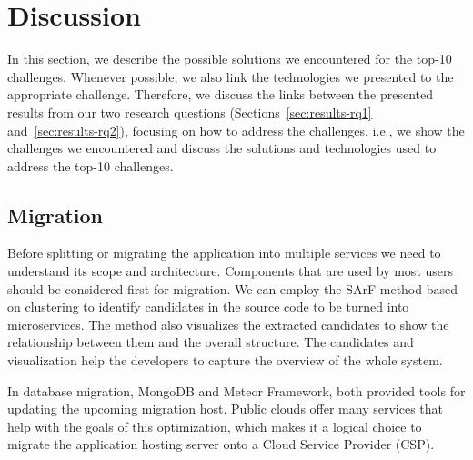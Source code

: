 
\section{Discussion}\label{sec:discussion}

In this section, we describe the possible solutions we encountered for the top-10 challenges. Whenever possible, we also link the technologies we presented to the appropriate challenge. Therefore, we discuss the links between the presented results from our two research questions (Sections~\ref{sec:results-rq1} and~\ref{sec:results-rq2}), focusing on how to address the challenges, i.e., we show the challenges we encountered and discuss the solutions and technologies used to address the top-10 challenges.

\subsection{Migration}%

Before splitting or migrating the application into multiple services we need to understand its scope and architecture. Components that are used by most users should be considered first for migration. 
%
We can employ the SArF method based on clustering to identify candidates in the source code to be turned into microservices. The method also visualizes the extracted candidates to show the relationship between them and the overall structure. The candidates and visualization help the developers to capture the overview of the whole system.\cite{Kamimura2018}

In database migration, MongoDB and Meteor Framework, both provided tools for updating the upcoming migration host. Public clouds offer many services that help with the goals of this optimization, which makes it a logical choice to migrate the application hosting server onto a Cloud Service Provider (CSP).\cite{Tuuli2020} %



